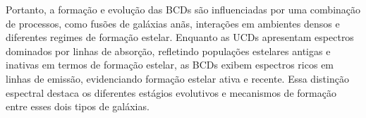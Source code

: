Portanto, a formação e evolução das BCDs são influenciadas por uma combinação de processos, como fusões de galáxias anãs, interações em ambientes densos e diferentes regimes de formação estelar. Enquanto as UCDs apresentam espectros dominados por linhas de absorção, refletindo populações estelares antigas e inativas em termos de formação estelar, as BCDs exibem espectros ricos em linhas de emissão, evidenciando formação estelar ativa e recente. Essa distinção espectral destaca os diferentes estágios evolutivos e mecanismos de formação entre esses dois tipos de galáxias.









